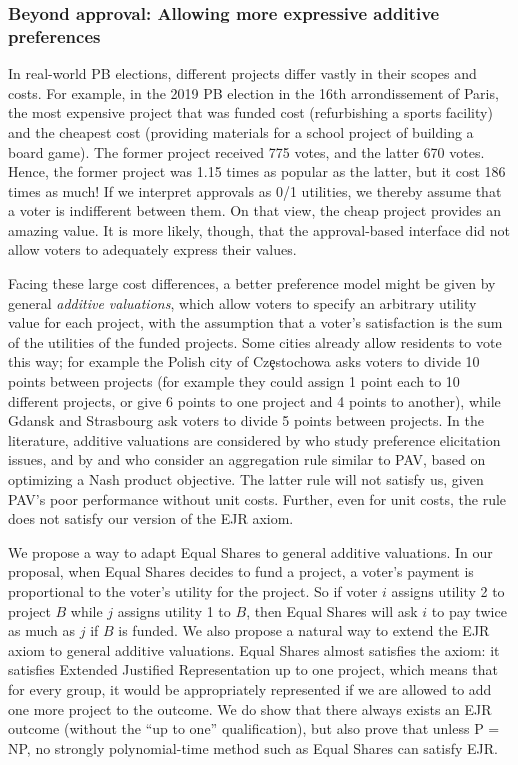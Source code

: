 \documentclass[10pt]{scrartcl}
\theoremstyle{definition}
\theoremstyle{plain}
\begin{document}
\subsubsection*{Beyond approval: Allowing more expressive additive preferences}

In real-world PB elections, different projects differ vastly in their scopes and costs. For example, in the 2019 PB election in the 16th arrondissement of Paris, the most expensive project that was funded cost  (refurbishing a sports facility) and the cheapest cost  (providing materials for a school project of building a board game).
The former project received 775 votes, and the latter 670 votes. Hence, the former project was 1.15 times as popular as the latter, but it cost 186 times as much! If we interpret approvals as 0/1 utilities, we thereby assume that a voter is indifferent between them. On that view, the cheap project provides an amazing value. It is more likely, though, that the approval-based interface did not allow voters to adequately express their values.

Facing these large cost differences, a better preference model might be given by general \emph{additive valuations}, which allow voters to specify an arbitrary utility value for each project, with the assumption that a voter's satisfaction is the sum of the utilities of the funded projects. Some cities already allow residents to vote this way; for example the Polish city of Cz\c{e}stochowa asks voters to divide 10 points between projects (for example they could assign 1 point each to 10 different projects, or give 6 points to one project and 4 points to another), while Gdansk and Strasbourg ask voters to divide 5 points between projects. In the literature, additive valuations are considered by \citet{benade2017preference} who study preference elicitation issues, and by \citet{fain2018fair} and \citet{fluschnik2019fair} who consider an aggregation rule similar to PAV, based on optimizing a Nash product objective. The latter rule will not satisfy us, given PAV's poor performance without unit costs. Further, even for unit costs, the rule does not satisfy our version of the EJR axiom.

We propose a way to adapt Equal Shares to general additive valuations. In our proposal, when Equal Shares decides to fund a project, a voter's payment is proportional to the voter's utility for the project. So if voter $i$ assigns utility 2 to project $B$ while $j$ assigns utility 1 to $B$, then Equal Shares will ask $i$ to pay twice as much as $j$ if $B$ is funded. We also propose a natural way to extend the EJR axiom to general additive valuations. Equal Shares almost satisfies the axiom: it satisfies Extended Justified Representation up to one project, which means that for every group, it would be appropriately represented if we are allowed to add one more project to the outcome. We do show that there always exists an EJR outcome (without the ``up to one'' qualification), but also prove that unless P = NP, no strongly polynomial-time method such as Equal Shares can satisfy EJR.
\end{document}
